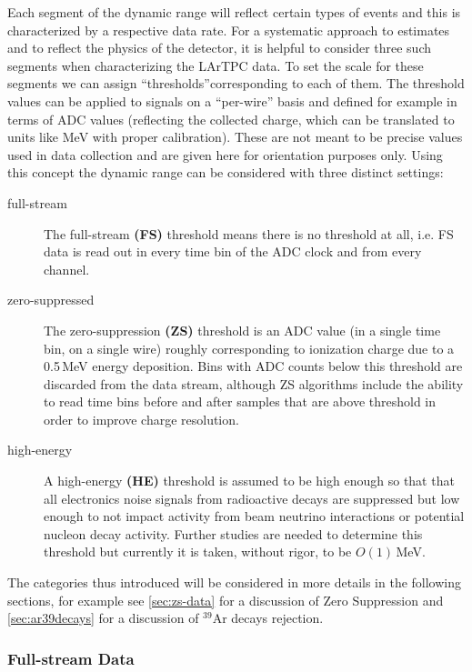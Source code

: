Each segment of the dynamic range will reflect certain types of events and this
is characterized by a respective data rate. For a systematic approach to estimates
and to reflect the physics of the detector, it is helpful to consider three such segments when characterizing the LArTPC data.
To set the scale for these segments we can assign ``thresholds''corresponding to each of them.
The threshold values can be applied to signals on a ``per-wire'' basis and defined for example
in terms of ADC values (reflecting the collected charge, which can be translated to units like MeV with proper calibration).
These are not meant to be precise values used in data collection and are given here for orientation purposes only.
Using this concept the dynamic range can be considered with three distinct settings:
\begin{description}
	
\item[full-stream] The full-stream \textbf{(FS)} threshold means there is no threshold at all, i.e.
FS data is read out in every time bin of the ADC clock and from every channel.

\item[zero-suppressed] The zero-suppression \textbf{(ZS)} threshold is an ADC value (in a single time bin,
on a single wire) roughly corresponding to ionization charge due to a 0.5\,MeV energy deposition.
Bins with ADC counts below this threshold are discarded from the data stream, although ZS algorithms include
the ability to read time bins before and after samples that are above threshold in order to improve charge resolution.

\item[high-energy] A high-energy \textbf{(HE)} threshold is assumed to be high enough so that
  that all electronics noise signals from radioactive decays are suppressed but low
  enough to not impact activity from beam neutrino interactions or potential nucleon decay activity.
  Further studies are needed to determine this threshold but currently
  it is taken, without rigor, to be $O(1)$\,MeV.

\end{description}

\noindent
The categories thus introduced will be considered in more details in the following sections, for example
see \ref{sec:zs-data} for a discussion of Zero Suppression and \ref{sec:ar39decays} for a discussion of
$^{39}$Ar decays rejection.


\subsubsection{Full-stream Data}

